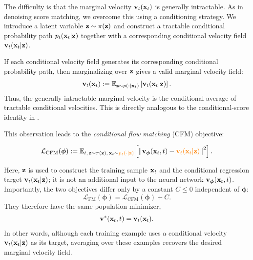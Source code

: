 The difficulty is that the marginal velocity ${\mathbf{v}}_t({\mathbf{x}}_t)$ is generally
intractable. As in denoising score matching, we overcome this using a
conditioning strategy. We introduce a latent variable
${\mathbf{z}}\sim\pi({\mathbf{z}})$ and construct a tractable conditional probability path
$p_t({\mathbf{x}}_t|{\mathbf{z}})$ together with a corresponding conditional velocity field
${\mathbf{v}}_t({\mathbf{x}}_t|{\mathbf{z}})$.

If each conditional velocity field generates its corresponding conditional
probability path, then marginalizing over ${\mathbf{z}}$ gives a valid marginal
velocity field:
\begin{align}\label{eq:marginal-oracle-velocity}
{\mathbf{v}}_t({\mathbf{x}}_t)
:=
\mathbb{E}_{{\mathbf{z}}\sim p(\cdot|{\mathbf{x}}_t)}
\left[
{\mathbf{v}}_t({\mathbf{x}}_t|{\mathbf{z}})
\right].
\end{align}
Thus, the generally intractable marginal velocity is the conditional average
of tractable conditional velocities. This is directly analogous to the
conditional-score identity in .

This observation leads to the \emph{conditional flow matching} (CFM)
objective:
\begin{mdframed}
\begin{align}\label{eq:fm-cfm}
\mathcal{L}_{\mathrm{CFM}}(\bm{\phi})
:=
\mathbb{E}_{t,\,{\mathbf{z}}\sim\pi({\mathbf{z}}),\,
{\mathbf{x}}_t\sim{\color{orange}p_t(\cdot|{\mathbf{z}})}}
\left[
\left\|
{\mathbf{v}}_{\bm{\phi}}({\mathbf{x}}_t,t)
-
{\color{orange}{\mathbf{v}}_t({\mathbf{x}}_t|{\mathbf{z}})}
\right\|^2
\right].
\end{align}
\end{mdframed}
Here, ${\mathbf{z}}$ is used to construct the training sample ${\mathbf{x}}_t$ and
the conditional regression target ${\mathbf{v}}_t({\mathbf{x}}_t|{\mathbf{z}})$; it is not an
additional input to the neural network ${\mathbf{v}}_{\bm{\phi}}({\mathbf{x}}_t,t)$. Importantly, the two objectives differ only by a constant $C\leq0$ independent of $\bm{\phi}$:
\[
\mathcal{L}_{\mathrm{FM}}(\bm{\phi})
=
\mathcal{L}_{\mathrm{CFM}}(\bm{\phi})
+
C.
\]
They therefore have the same population minimizer,
\begin{align}\label{eq:minimum_velocity}
{\mathbf{v}}^*({\mathbf{x}}_t,t)
=
{\mathbf{v}}_t({\mathbf{x}}_t).
\end{align}
In other words, although each training example uses a conditional velocity
${\mathbf{v}}_t({\mathbf{x}}_t|{\mathbf{z}})$ as its target, averaging over these examples recovers
the desired marginal velocity field.


